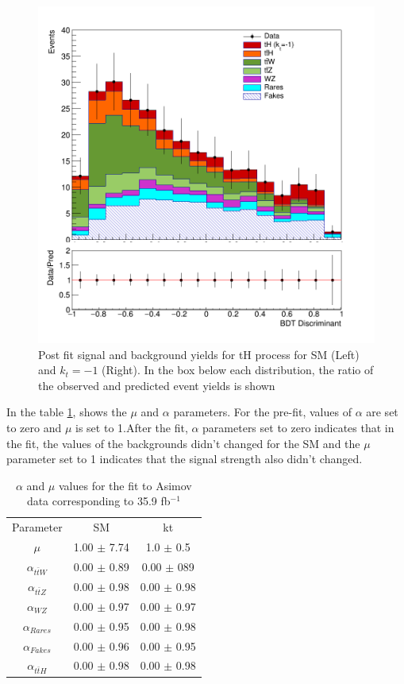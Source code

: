 \begin{figure}[!htbp]
\begin{minipage}[b]{0.48\textwidth}
		\includegraphics[width=\textwidth]{Chapter4/simple-kt-1.png}
	\end{minipage}
	\caption{Post fit signal and background yields for tH process for SM (Left) and $k_t=-1$ (Right).
		In the box below each distribution, the ratio of the observed and predicted event yields is shown}
\label{simple}
\end{figure}
In the table \ref{parameters}, shows the $\mu$ and $\alpha$ parameters. For the pre-fit, values of $\alpha$ are set to zero and $\mu$ is set to 1.After the fit,  $\alpha$ parameters set to zero indicates that in the fit, the values of the backgrounds didn't changed for the SM and the $\mu$ parameter set to 1 indicates that the signal strength also didn't changed.
\begin{table}[ht]
	\centering
	\caption{$\alpha$ and $\mu$ values  for the fit to Asimov data corresponding to 35.9 fb$^{-1}$}
	\begin{tabular}{ccc}
		\hline
		Parameter  & SM &kt\\
		$\mu$   & 1.00 $\pm$  7.74& 1.0 $\pm$  0.5\\
		$\alpha_{t\bar{t}W}$&  0.00 $\pm$  0.89&  0.00 $\pm$  089\\
		$\alpha_{t\bar{t}Z}$ &  0.00 $\pm$  0.98& 0.00 $\pm$  0.98\\
		$\alpha_{WZ}$   & 0.00 $\pm$  0.97& 0.00 $\pm$  0.97\\
		$\alpha_{Rares}$   &0.00 $\pm$  0.95&0.00 $\pm$  0.98 \\
		$\alpha_{Fakes}$ &   0.00 $\pm$  0.96& 0.00 $\pm$  0.95\\
		$\alpha_{t\bar{t}H}$ &0.00 $\pm$  0.98& 0.00 $\pm$ 0.98\\
	\end{tabular}
\label{parameters}
\end{table}


